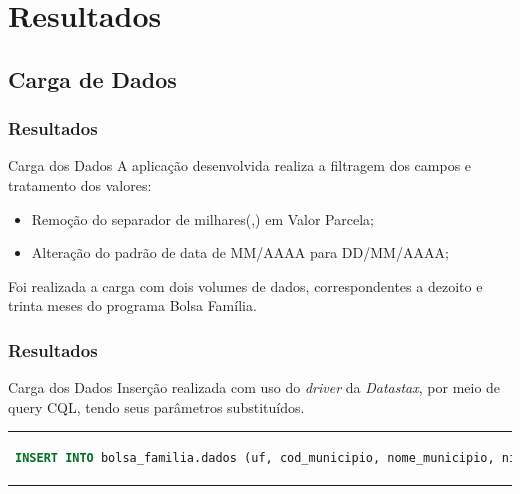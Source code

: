 \documentclass[brazil]{beamer}
\begin{document}
\section{Resultados}

\subsection{Carga de Dados}
\begin{frame}
	\frametitle{Resultados}
	\begin{block}{Carga dos Dados}
		A aplicação desenvolvida realiza a filtragem dos campos e tratamento dos valores:
		\begin{itemize}
			\item Remoção do separador de milhares(,) em Valor Parcela;
			\item Alteração do padrão de data de MM/AAAA para DD/MM/AAAA;		
		\end{itemize}
	
		Foi realizada a carga com dois volumes de dados, correspondentes a dezoito e trinta meses do programa Bolsa Família.
		\begin{table}
			\centering
			\caption{Volume de dados}
		\end{table}	
	\end{block}
\end{frame}

\begin{frame}[fragile]
	\frametitle{Resultados}
	\begin{block}{Carga dos Dados}
	Inserção realizada com uso do \emph{driver} da \emph{Datastax}, por meio de query CQL, tendo seus parâmetros substituídos.
	
	\begin{tabular}{c}
		\begin{lstlisting}[caption={Código CQL para inserção},language=SQL]
			INSERT INTO bolsa_familia.dados (uf, cod_municipio, nome_municipio, nis_favorecido, nome_favorecido, fonte, valor, periodo) VALUES (?, ?, ?, ?, ?, ?, ?, ?)
		\end{lstlisting}
	\end{tabular}
	\end{block}
\end{frame}
\end{document}
